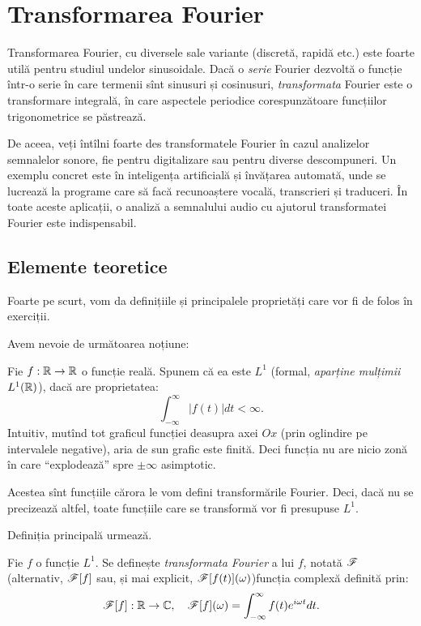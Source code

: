 
\chapter{Transformarea Fourier}

Transformarea Fourier, cu diversele sale variante (discretă, rapidă etc.)
este foarte utilă pentru studiul undelor sinusoidale. Dacă o \emph{serie}
Fourier dezvoltă o funcție într-o serie în care termenii sînt sinusuri
și cosinusuri, \emph{transformata} Fourier este o transformare integrală,
în care aspectele periodice corespunzătoare funcțiilor trigonometrice
se păstrează.

De aceea, veți întîlni foarte des transformatele Fourier în cazul analizelor
semnalelor sonore, fie pentru digitalizare sau pentru diverse descompuneri.
Un exemplu concret este în inteligența artificială și învățarea automată,
unde se lucrează la programe care să facă recunoaștere vocală, transcrieri
și traduceri. În toate aceste aplicații, o analiză a semnalului audio cu
ajutorul transformatei Fourier este indispensabil.

\section{Elemente teoretice}

Foarte pe scurt, vom da definițiile și principalele proprietăți care vor
fi de folos în exerciții.

Avem nevoie de următoarea noțiune:
\begin{definition}\label{def:functie-l1}
  Fie $ f : \mathbb{R} \to \mathbb{R} $ o funcție reală. Spunem că ea este $ L^1 $
  (formal, \emph{aparține mulțimii $ L^1(\mathbb{R}) $}), dacă are proprietatea:
  \[
    \int_{-\infty}^\infty |f(t)| dt < \infty.
  \]
  Intuitiv, mutînd tot graficul funcției deasupra axei $ Ox $ (prin
  oglindire pe intervalele negative), aria de sun grafic este finită.
  Deci funcția nu are nicio zonă în care \enquote{explodează} spre
  $ \pm \infty $ asimptotic.
\end{definition}

Acestea sînt funcțiile cărora le vom defini transformările Fourier. Deci,
dacă nu se precizează altfel, toate funcțiile care se transformă vor fi
presupuse $ L^1 $.

Definiția principală urmează.

\begin{definition}\label{def:transf-f}
  Fie $ f $ o funcție $ L^1 $. Se definește \emph{transformata Fourier} a lui
  $ f $, notată $ \mathscr{F} $ (alternativ, $ \mathscr{F}[f] $ sau, și mai
  explicit, $ \mathscr{F}[f(t)](\omega) $)\footnotemark funcția complexă
  definită prin:
  \[
    \kal{F}[f] : \RR \to \CC, \quad \kal{F}[f](\omega) = %
    \int_{-\infty}^\infty f(t) e^{i\omega t} dt.
  \]
\end{definition}

